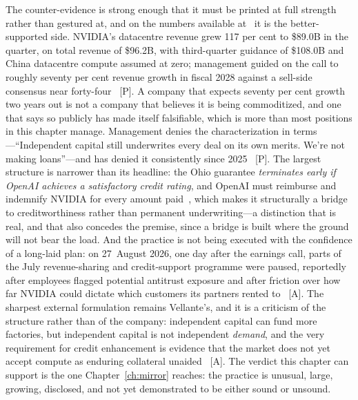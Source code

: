 The counter-evidence is strong enough that it must be printed at full strength rather than gestured at, and on the numbers available at \datafreeze\ it is the better-supported side. NVIDIA's datacentre revenue grew 117 per cent to \$89.0B in the quarter, on total revenue of \$96.2B, with third-quarter guidance of \$108.0B and China datacentre compute assumed at zero; management guided on the call to roughly seventy per cent revenue growth in fiscal 2028 against a sell-side consensus near forty-four~\cite{nvda-q2fy27,nvda-segments} [P]. A company that expects seventy per cent growth two years out is not a company that believes it is being commoditized, and one that says so publicly has made itself falsifiable, which is more than most positions in this chapter manage. Management denies the characterization in terms---``Independent capital still underwrites every deal on its own merits. We're not making loans''---and has denied it consistently since 2025~\cite{nvda-defence,nvda-critique} [P]. The largest structure is narrower than its headline: the Ohio guarantee \emph{terminates early if OpenAI achieves a satisfactory credit rating}, and OpenAI must reimburse and indemnify NVIDIA for every amount paid~\cite{nvda-ohio}, which makes it structurally a bridge to creditworthiness rather than permanent underwriting---a distinction that is real, and that also concedes the premise, since a bridge is built where the ground will not bear the load. And the practice is not being executed with the confidence of a long-laid plan: on 27~August 2026, one day after the earnings call, parts of the July revenue-sharing and credit-support programme were paused, reportedly after employees flagged potential antitrust exposure and after friction over how far NVIDIA could dictate which customers its partners rented to~\cite{nvda-pause} [A]. The sharpest external formulation remains Vellante's, and it is a criticism of the structure rather than of the company: independent capital can fund more factories, but independent capital is not independent \emph{demand}, and the very requirement for credit enhancement is evidence that the market does not yet accept compute as enduring collateral unaided~\cite{nvda-critique} [A]. The verdict this chapter can support is the one Chapter~\ref{ch:mirror} reaches: the practice is unusual, large, growing, disclosed, and not yet demonstrated to be either sound or unsound.

